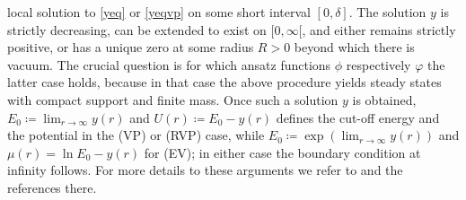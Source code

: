 \documentclass[11pt]{article}
\begin{document}
local solution to \eqref{yeq} or \eqref{yeqvp} on some short interval
$[0,\delta]$. The solution $y$ is strictly decreasing, can be extended
to exist on $[0,\infty[$, and either remains strictly positive, or has
a unique zero at some radius $R>0$ beyond which there is vacuum.
The crucial question is for which ansatz functions
$\phi$ respectively $\varphi$ the latter case holds, because in that case
the above procedure yields steady states with compact support and finite mass.
Once such a solution $y$ is obtained, $E_0\coloneqq\lim_{r\to\infty}y(r)$
and $U(r)\coloneqq E_0-y(r)$ defines the cut-off
energy and the potential in the (VP) or (RVP) case, while
$E_0\coloneqq\exp(\lim_{r\to\infty}y(r))$ and
$\mu(r)=\ln E_0 - y(r)$ for (EV); in either case the boundary condition
at infinity follows. 
For more details to these arguments we refer to
\cite{RaRe} and the references there.
\end{document}
